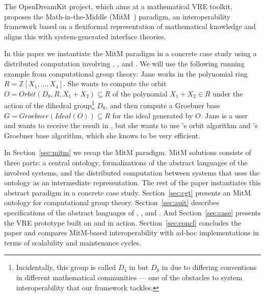 The OpenDreamKit project, which aims at a mathematical VRE toolkit, proposes the Math-in-the-Middle (MitM~\cite{DehKohKon:iop16}) paradigm, an interoperability framework based on a flexiformal representation of mathematical knowledge and aligns this with system-generated interface theories. 

In this paper we instantiate the MitM paradigm in a concrete case study using a distributed computation involving \GAP, \Sage, and \Singular.
We will use the following running example from computational group theory: Jane works in the polynomial ring $R=\mathbb{Z}[X_1,\ldots,X_4]$.
She wants to compute the orbit $O=Orbit(D_8,R,X_1+X_2)\subseteq R$ of the polynomial $X_1+X_2\in R$ under the action of the dihedral group\footnote{Incidentally, this group is called $D_4$ in \Sage but $D_8$ in \GAP due to differing conventions in different mathematical communities --- one of the obstacles to system interoperability that our framework tackles.} $D_8$, and then compute a Groebner base $G=Groebner(Ideal(O))\subseteq R$ for the ideal generated by $O$.
Jane is a \Sage user and wants to receive the result in \Sage, but she wants to use \GAP's orbit algorithm and \Singular's Groebner base algorithm, which she knows to be very efficient.

In Section~\ref{sec:mitm} we recap the MitM paradigm.
MitM solutions consists of three parts: a central ontology, formalizations of the abstract languages of the involved systems, and the distributed computation between systems that uses the ontology as an intermediate representation.
The rest of the paper instantiates this abstract paradigm in a concrete case study.
Section~\ref{sec:cgt} presents an MitM ontology for computational group theory.
Section~\ref{sec:apit} describes specifications of the abstract languages of \GAP, \Sage, and \Singular.
And Section~\ref{sec:case} presents the VRE prototype built on \GAP and \Singular in action.
Section~\ref{sec:concl} concludes the paper and compares MitM-based interoperability with ad-hoc implementations in terms of scalability and maintenance cycles. 



